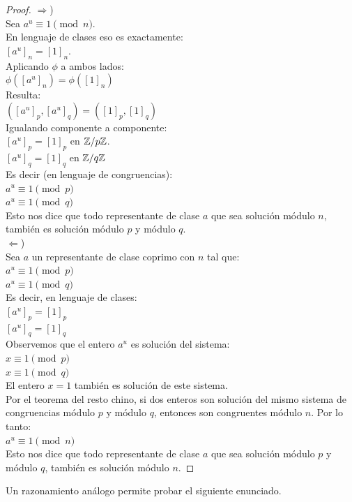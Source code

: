 \begin{proof} $\Rightarrow$) \\
Sea $a^u \equiv 1 \pmod n$. \\
En lenguaje de clases eso es exactamente: \\
$[a^u]_n = [1]_n$. \\
Aplicando $\phi$ a ambos lados: \\
$\phi ([a^u]_n) = \phi ([1]_n)$ \\
Resulta: \\
$([a^u]_p,[a^u]_q) = ([1]_p,[1]_q)$ \\
Igualando componente a componente: \\
$[a^u]_p = [1]_p$ en $\mathbb{Z}/p\mathbb{Z}$.\\
$[a^u]_q = [1]_q$ en $\mathbb{Z}/q\mathbb{Z}$ \\
Es decir (en lenguaje de congruencias): \\
$a^u \equiv 1 \pmod p$ \\
$a^u \equiv 1 \pmod q$ \\
Esto nos dice que todo representante de clase $a$ que sea solución módulo $n$, también es solución módulo $p$ y módulo $q$. \\
$\Leftarrow$) \\
Sea $a$ un representante de clase coprimo con $n$ tal que:\\
$a^u \equiv 1 \pmod p$ \\
$a^u \equiv 1 \pmod q$ \\
Es decir, en lenguaje de clases: \\
$[a^u]_p = [1]_p$ \\
$[a^u]_q = [1]_q$ \\
Observemos que el entero $a^u$ es solución del sistema: \\
$x \equiv 1 \pmod p$ \\
$x \equiv 1 \pmod q$ \\
El entero $x=1$ también es solución de este sistema. \\
Por el teorema del resto chino, si dos enteros son solución del mismo sistema de congruencias módulo $p$ y módulo $q$, entonces son congruentes módulo $n$. Por lo tanto: \\
$a^u \equiv 1 \pmod n$ \\
Esto nos dice que todo representante de clase $a$ que sea solución módulo $p$ y módulo $q$, también es solución módulo $n$.
\end{proof}

Un razonamiento análogo permite probar el siguiente enunciado.

